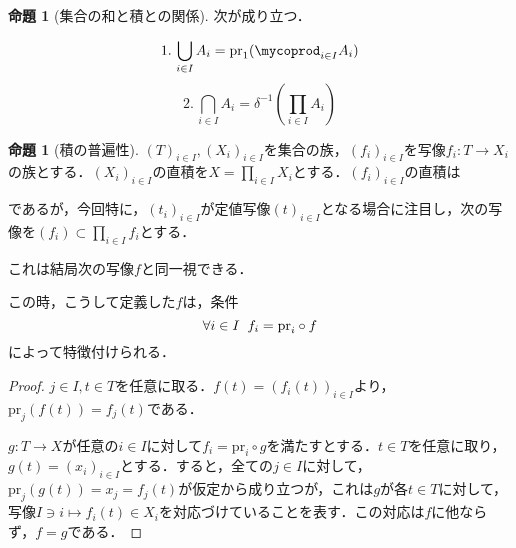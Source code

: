 \documentclass[uplatex, 12pt, dvipdfmx]{jsreport}
\theoremstyle{definition}
\newtheorem{proposition}[theorem]{命題}
\theoremstyle{StatementsWithStar}
\theoremstyle{StatementsWithStar2}
\theoremstyle{StatementsWithStar3}
\theoremstyle{StatementsWithCCirc}
\theoremstyle{definition}
\let\coprod\mycoprod
\begin{document}
\begin{proposition}[集合の和と積との関係]\rm{}
    次が成り立つ．

    $$1.\, \bigcup_{i\in I}A_i = \mathrm{pr}_1(\coprod_{i\in I}A_i)$$
    $$2.\, \bigcap_{i\in I}A_i = \delta^{-1}(\prod_{i\in I}A_i)$$
\end{proposition}

\begin{shadebox}\begin{proposition}[積の普遍性]
    $(T)_{i\in I}, (X_i)_{i\in I}$を集合の族，$(f_i)_{i\in I}$を写像$f_i:T\to X_i$の族とする．$(X_i)_{i\in I}$の直積を$X=\prod_{i\in I}X_i$とする．$(f_i)_{i\in I}$の直積は
    \begin{center}\end{center}
    であるが，今回特に，$(t_i)_{i\in I}$が定値写像$(t)_{i\in I}$となる場合に注目し，次の写像を$(f_i)\subset \prod_{i\in I}f_i$とする．
    \begin{center}\end{center}
    これは結局次の写像$f$と同一視できる．
    \begin{center}\end{center}
    この時，こうして定義した$f$は，条件$$\forall i\in I \hspace{2mm} f_i=\mathrm{pr}_i\circ f$$
    によって特徴付けられる．
\end{proposition}\end{shadebox}
\begin{proof}
    $j\in I, t\in T$を任意に取る．$f(t)=(f_i(t))_{i\in I}$より，$\mathrm{pr}_j(f(t))=f_j(t)$である．

    $g:T\to X$が任意の$i\in I$に対して$f_i=\mathrm{pr}_i\circ g$を満たすとする．$t\in T$を任意に取り，$g(t)=(x_i)_{i\in I}$とする．すると，全ての$j\in I$に対して，$\mathrm{pr}_j(g(t))=x_j=f_j(t)$が仮定から成り立つが，これは$g$が各$t\in T$に対して，写像$I\ni i\mapsto f_i(t)\in X_i$を対応づけていることを表す．この対応は$f$に他ならず，$f=g$である．
\end{proof}
\end{document}
